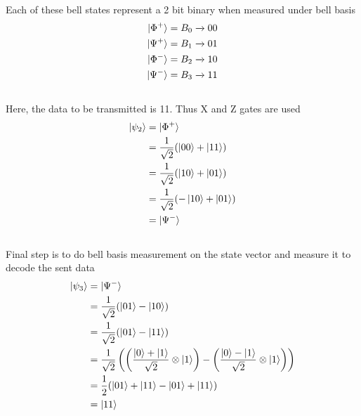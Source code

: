 \documentclass[12pt]{article}
\begin{document}
  Each of these bell states represent a 2 bit binary when measured under bell basis\\
  \begin{equation*}
    \begin{split}
      \ket{\Phi^+} = B_0 \xrightarrow{} 00\\
      \ket{\Psi^+} = B_1 \xrightarrow{} 01\\
      \ket{\Phi^-} = B_2 \xrightarrow{} 10\\
      \ket{\Psi^-} = B_3 \xrightarrow{} 11
    \end{split}
  \end{equation*}\\
  Here, the data to be transmitted is 11. Thus X and Z gates are used\\
  \begin{equation*}
    \begin{split}
      \ket{\psi_2} & = \ket{\Phi^+}\\
      & = \frac{1}{\sqrt{2}}(\ket{00} + \ket{11})\\
      & = \frac{1}{\sqrt{2}}(\ket{10} + \ket{01})\\
      & = \frac{1}{\sqrt{2}}(-\ket{10} + \ket{01})\\
      & = \ket{\Psi^-}
    \end{split}
  \end{equation*}\\
  Final step is to do bell basis measurement on the state vector and measure it to decode the sent data\\
  \begin{equation*}
    \begin{split}
      \ket{\psi_3} & = \ket{\Psi^-}\\
      & = \frac{1}{\sqrt{2}}(\ket{01} - \ket{10})\\
      & = \frac{1}{\sqrt{2}}(\ket{01} - \ket{11})\\
      & = \frac{1}{\sqrt{2}} \left( \left( \frac{\ket{0} + \ket{1}}{\sqrt{2}} \otimes \ket{1} \right) - \left( \frac{\ket{0} - \ket{1}}{\sqrt{2}} \otimes \ket{1} \right) \right)\\
      & = \frac{1}{2}(\ket{01} + \ket{11} - \ket{01} + \ket{11})\\
      & = \ket{11}
    \end{split}
  \end{equation*}\\
\end{document}
